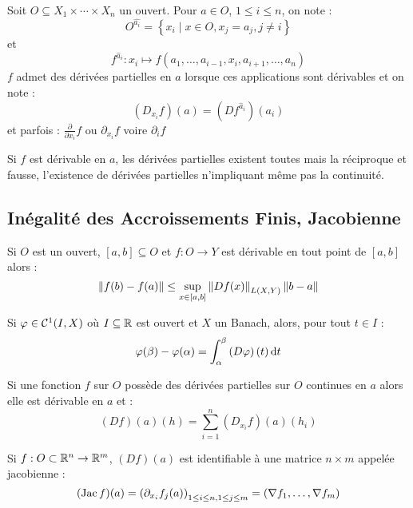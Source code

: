 \documentclass{cours}
\begin{document}
\begin{definition}
    Soit $O \subseteq X_{1} \times \cdots \times X_{n}$ un ouvert. Pour $a \in O$, $1 \leq i \leq n$, on note :
    \[
        O^{\hat{a_{i}}} = \left\{x_{i}\mid x \in O, x_{j} = a_{j}, j \neq i\right\}
    \]
    et 
    \[
        f^{\hat{a}_{i}} : x_{i} \mapsto f(a_{1}, \ldots, a_{i - 1}, x_{i}, a_{i + 1}, \ldots, a_{n})
    \]
    $f$ admet des dérivées partielles en $a$ lorsque ces applications sont dérivables et on note : 
    \[
        (D_{x_{i}}f)(a) = (Df^{\hat{a}_{i}})(a_{i}) 
    \]
    et parfois : $\frac{\partial}{\partial x_{i}}f$ ou $\partial_{x_{i}}f$ voire $\partial_{i}f$
\end{definition}

\begin{proposition}
    Si $f$ est dérivable en $a$, les dérivées partielles existent toutes mais la réciproque et fausse, l'existence de dérivées partielles n'impliquant même pas la continuité. 
\end{proposition}

\subsection{Inégalité des Accroissements Finis, Jacobienne}
\begin{lemma}
    Si $O$ est un ouvert, $\left[a, b\right] \subseteq O$ et $f : O \rightarrow Y$ est dérivable en tout point de $\left[a, b\right]$ alors :
    \[
        \left\lVert f(b) - f(a) \right\rVert \leq \sup_{x \in \left[a, b \right]} \left\lVert Df(x) \right\rVert_{L(X, Y)} \left\lVert b - a \right\rVert
    \]
\end{lemma}

\begin{proposition}
    Si $\varphi \in \mathcal{C}^{1}(I, X)$ où $I \subseteq \mathbb{R}$ est ouvert et $X$ un Banach, alors, pour tout $t \in I$ :
    \[
        \varphi(\beta) - \varphi(\alpha) = \int_{\alpha}^{\beta}\left(D\varphi\right)(t){\rm \, d} t
    \]
\end{proposition}

\begin{corollary}
    Si une fonction $f$ sur $O$ possède des dérivées partielles sur $O$ continues en $a$ alors elle est dérivable en $a$ et : 
    \[
        (Df)(a)(h) = \sum_{i = 1}^{n}(D_{x_{i}}f)(a)(h_{i})
    \]
\end{corollary}

\begin{definition}
    Si $f : O \subset \mathbb{R}^{n} \rightarrow \mathbb{R}^{m}$, $(Df)(a)$ est identifiable à une matrice $n \times m$ appelée jacobienne :
    \[
        (\operatorname{Jac} f)(a) = \left(\partial_{x_{i}}f_{j}(a)\right)_{1\leq i \leq n, 1\leq j\leq m} = \left(\nabla f_{1}, \ldots, \nabla f_{m}\right)
    \] 
\end{definition}
\end{document}
